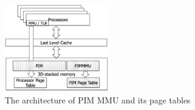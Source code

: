 \begin{figure}[t]
  \centering
  \includegraphics[height=1.5in]{figures/pim_mmu}
  \caption{The architecture of PIM MMU and its page tables}
  \label{fig:pim_mmu}
\end{figure}
